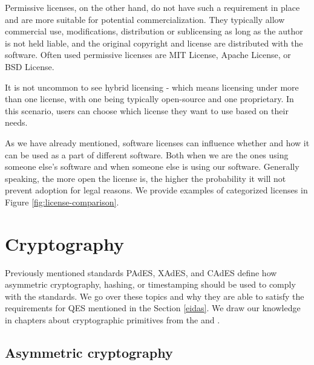 \documentclass[thesismargins, english, thesislinespacing, onelinechapterstyle, upjsfrontpage]{rnthesis}
\begin{document}
Permissive licenses, on the other hand, do not have such a requirement in place and are more suitable for potential commercialization.
They typically allow commercial use, modifications, distribution or sublicensing as long as the author is not held liable, and the original copyright and license are distributed with the software.
Often used permissive licenses are MIT License, Apache License, or BSD License.

It is not uncommon to see hybrid licensing - which means licensing under more than one license, with one being typically open-source and one proprietary.
In this scenario, users can choose which license they want to use based on their needs.


As we have already mentioned, software licenses can influence whether and how it can be used as a part of different software.
Both when we are the ones using someone else's software and when someone else is using our software.
Generally speaking, the more open the license is, the higher the probability it will not prevent adoption for legal reasons.
We provide examples of categorized licenses in Figure \ref{fig:license-comparison}.

\iffalse %
Various possible combinations can be seen in Figure \ref{fig:license-compatibility}, where greyed out options mean such combination is not possible unless a separate licensing agreement is reached with the copyright owner.

\obrazok{./figures/license-compatibility}{Schematic representation of license directionality. \osoba{Morin 2012} \cite{licensing}}{license-compatibility}
\fi

\section{Cryptography} \label{cryptography}

Previously mentioned standards PAdES, XAdES, and CAdES define how asymmetric cryptography, hashing, or timestamping should be used to comply with the standards.
We go over these topics and why they are able to satisfy the requirements for QES mentioned in the Section \ref{eidas}.
We draw our knowledge in chapters about cryptographic primitives from the \cite{cryptotxtbook} and \cite{cryptojoy}.

\subsection{Asymmetric cryptography}
\end{document}
